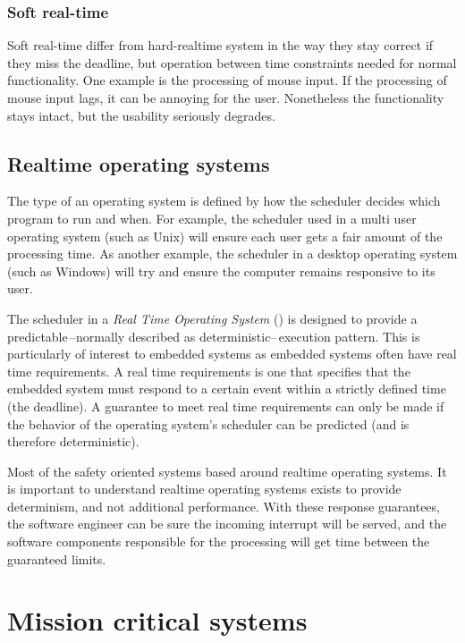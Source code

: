 \subsubsection{Soft real-time}

Soft real-time differ from hard-realtime system in the way they stay correct if they miss the deadline, but operation between time constraints needed for normal functionality. One example is the processing of mouse input. If the processing of mouse input lags, it can be annoying for the user. Nonetheless the functionality stays intact, but the usability seriously degrades.

\subsection{Realtime operating systems}

The type of an operating system is defined by how the scheduler decides which program to run and when. For example, the scheduler used in a multi user operating system (such as Unix) will ensure each user gets a fair amount of the processing time. As another example, the scheduler in a desktop operating system (such as Windows) will try and ensure the computer remains responsive to its user.

The scheduler in a \emph{Real Time Operating System} (\rtos) is designed to provide a predictable\,--normally described as deterministic--\,execution pattern. This is particularly of interest to embedded systems as embedded systems often have real time requirements. A real time requirements is one that specifies that the embedded system must respond to a certain event within a strictly defined time (the deadline). A guarantee to meet real time requirements can only be made if the behavior of the operating system's scheduler can be predicted (and is therefore deterministic).\citep{RTOS}

Most of the safety oriented systems based around realtime operating systems. It is important to understand realtime operating systems exists to provide determinism, and not additional performance. With these response guarantees, the software engineer can be sure the incoming interrupt will be served, and the software components responsible for the processing will get \cpu time between the guaranteed limits.

\section{Mission critical systems}

